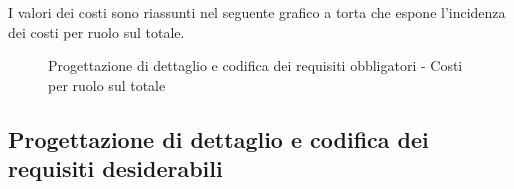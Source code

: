 			\noindent
			I valori dei costi sono riassunti nel seguente grafico a torta che espone l’incidenza dei costi per ruolo sul totale.
			\begin{center}
				\begin{figure}[htbp]
				\vspace{0.8cm}
				\caption{Progettazione di dettaglio e codifica dei requisiti obbligatori - Costi per ruolo sul totale}
				\end{figure}
			\end{center}
		
	
	\subsection{Progettazione di dettaglio e codifica dei requisiti desiderabili} %
	\label{sub:progettazione_di_dettaglio_e_codifica_dei_requisiti_desiderabili}
